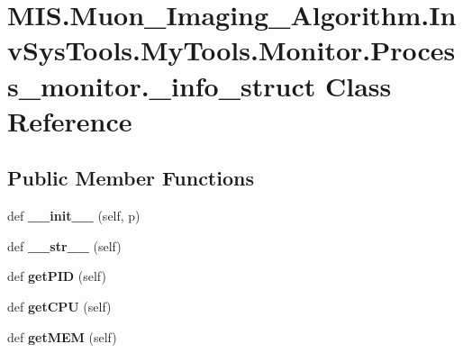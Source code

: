 \hypertarget{classMIS_1_1Muon__Imaging__Algorithm_1_1InvSysTools_1_1MyTools_1_1Monitor_1_1Process__monitor_1_1__info__struct}{}\section{M\+I\+S.\+Muon\+\_\+\+Imaging\+\_\+\+Algorithm.\+Inv\+Sys\+Tools.\+My\+Tools.\+Monitor.\+Process\+\_\+monitor.\+\_\+info\+\_\+struct Class Reference}
\label{classMIS_1_1Muon__Imaging__Algorithm_1_1InvSysTools_1_1MyTools_1_1Monitor_1_1Process__monitor_1_1__info__struct}
\subsection*{Public Member Functions}
\begin{DoxyCompactItemize}
\item 
\mbox{\label{classMIS_1_1Muon__Imaging__Algorithm_1_1InvSysTools_1_1MyTools_1_1Monitor_1_1Process__monitor_1_1__info__struct_a8d6f0c7cacc3e56856bf408cd9149bb0}} 
def {\bfseries \+\_\+\+\_\+init\+\_\+\+\_\+} (self, p)
\item 
\mbox{\label{classMIS_1_1Muon__Imaging__Algorithm_1_1InvSysTools_1_1MyTools_1_1Monitor_1_1Process__monitor_1_1__info__struct_ac83e128bb1171df39eefbfaee87efbb4}} 
def {\bfseries \+\_\+\+\_\+str\+\_\+\+\_\+} (self)
\item 
\mbox{\label{classMIS_1_1Muon__Imaging__Algorithm_1_1InvSysTools_1_1MyTools_1_1Monitor_1_1Process__monitor_1_1__info__struct_a65e9dfb9673b1d35b5756ca5d80abd32}} 
def {\bfseries get\+P\+ID} (self)
\item 
\mbox{\label{classMIS_1_1Muon__Imaging__Algorithm_1_1InvSysTools_1_1MyTools_1_1Monitor_1_1Process__monitor_1_1__info__struct_a456a240da358d53b8b3283adaf85b83e}} 
def {\bfseries get\+C\+PU} (self)
\item 
\mbox{\label{classMIS_1_1Muon__Imaging__Algorithm_1_1InvSysTools_1_1MyTools_1_1Monitor_1_1Process__monitor_1_1__info__struct_a7e1f68b26c755b910f2e4f0480a49bb9}} 
def {\bfseries get\+M\+EM} (self)
\end{DoxyCompactItemize}
